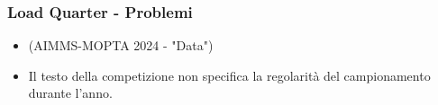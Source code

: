 \documentclass{beamer}
\begin{document}
\begin{frame}
    \frametitle{Load Quarter - Problemi}
    \begin{itemize}
        \item {} (AIMMS-MOPTA 2024 - "Data")
        \item Il testo della competizione non specifica la regolarità del campionamento durante l'anno.
    \end{itemize}
    \vspace{0.5cm}
    \vfill
    \begin{overlayarea}{\textwidth}{\textheight}
        \vfill
        \centering
    \end{overlayarea}
\end{frame}

\end{document}
